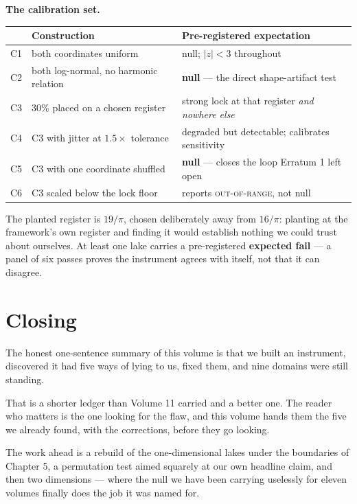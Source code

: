 \documentclass[11pt, letterpaper, openany]{book}
\begin{document}
\begin{predictionbox}
\textbf{The calibration set.}

\medskip
\begin{tabular}{@{}llp{}@{}}
\toprule
& \textbf{Construction} & \textbf{Pre-registered expectation} \\
\midrule
C1 & both coordinates uniform & null; $\lvert z\rvert < 3$ throughout \\
C2 & both log-normal, no harmonic relation & \textbf{null} --- the direct shape-artifact test \\
C3 & 30\% placed on a chosen register & strong lock at that register \emph{and nowhere else} \\
C4 & C3 with jitter at $1.5\times$ tolerance & degraded but detectable; calibrates sensitivity \\
C5 & C3 with one coordinate shuffled & \textbf{null} --- closes the loop Erratum 1 left open \\
C6 & C3 scaled below the lock floor & reports \textsc{out-of-range}, not null \\
\bottomrule
\end{tabular}

\medskip
\noindent The planted register is $19/\pi$, chosen deliberately away from $16/\pi$: planting at
the framework's own register and finding it would establish nothing we could trust about
ourselves. At least one lake carries a pre-registered \textbf{expected fail} --- a panel of six
passes proves the instrument agrees with itself, not that it can disagree.
\end{predictionbox}

\section{Closing}

The honest one-sentence summary of this volume is that we built an instrument, discovered it had
five ways of lying to us, fixed them, and nine domains were still standing.

That is a shorter ledger than Volume 11 carried and a better one. The reader who matters is the
one looking for the flaw, and this volume hands them the five we already found, with the
corrections, before they go looking.

The work ahead is a rebuild of the one-dimensional lakes under the boundaries of Chapter 5,
a permutation test aimed squarely at our own headline claim, and then two dimensions --- where
the null we have been carrying uselessly for eleven volumes finally does the job it was named
for.
\end{document}
